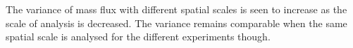 \documentclass[11pt,a4paper]{article}
\begin{document}
The variance of mass flux with different spatial scales is seen to increase as the scale of analysis is decreased. The variance remains comparable when the same spatial scale is analysed for the different experiments though.

%
%
\printbibliography[title={References}]
\end{document}
